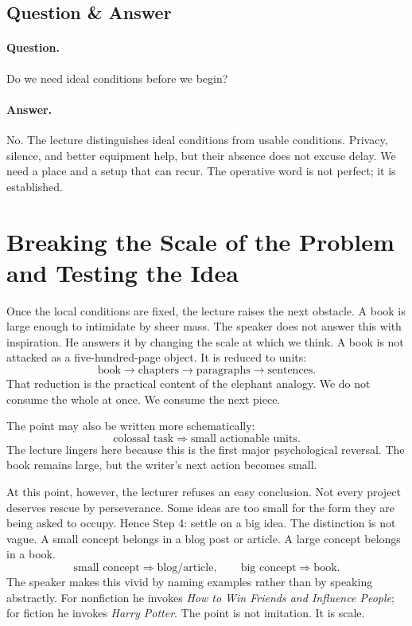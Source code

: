 \subsection{Question \& Answer}

\paragraph{Question.} Do we need ideal conditions before we begin?

\paragraph{Answer.} No. The lecture distinguishes ideal conditions from usable conditions. Privacy, silence, and better equipment help, but their absence does not excuse delay. We need a place and a setup that can recur. The operative word is not perfect; it is established.

\section{Breaking the Scale of the Problem and Testing the Idea}

Once the local conditions are fixed, the lecture raises the next obstacle. A book is large enough to intimidate by sheer mass. The speaker does not answer this with inspiration. He answers it by changing the scale at which we think. A book is not attacked as a five-hundred-page object. It is reduced to units:
\begin{equation}
\text{book} \to \text{chapters} \to \text{paragraphs} \to \text{sentences}.
\end{equation}
That reduction is the practical content of the elephant analogy. We do not consume the whole at once. We consume the next piece.

The point may also be written more schematically:
\begin{equation}
\text{colossal task} \Rightarrow \text{small actionable units}.
\end{equation}
The lecture lingers here because this is the first major psychological reversal. The book remains large, but the writer's next action becomes small.

At this point, however, the lecturer refuses an easy conclusion. Not every project deserves rescue by perseverance. Some ideas are too small for the form they are being asked to occupy. Hence Step 4: settle on a big idea. The distinction is not vague. A small concept belongs in a blog post or article. A large concept belongs in a book.
\begin{equation}
\text{small concept} \Rightarrow \text{blog/article}, \qquad
\text{big concept} \Rightarrow \text{book}.
\end{equation}
The speaker makes this vivid by naming examples rather than by speaking abstractly. For nonfiction he invokes \textit{How to Win Friends and Influence People}; for fiction he invokes \textit{Harry Potter}. The point is not imitation. It is scale.

